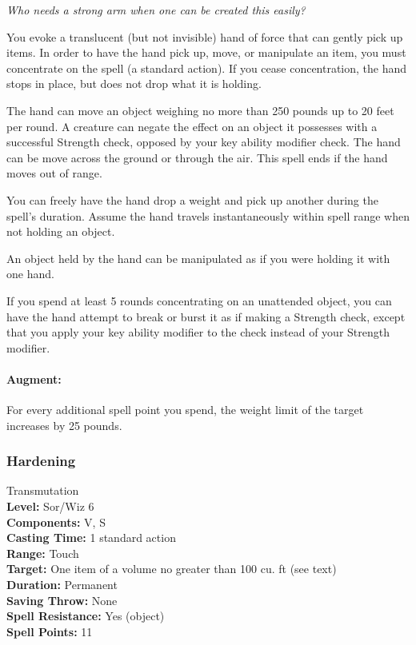 \emph{Who needs a strong arm when one can be created this easily?}

You evoke a translucent (but not invisible) hand of force that can gently pick up items.
In order to have the hand pick up, move, or manipulate an item, you must concentrate on the spell (a standard action).
If you cease concentration, the hand stops in place, but does not drop what it is holding.

The hand can move an object weighing no more than 250 pounds up to 20 feet per round. 
A creature can negate the effect on an object it possesses with a successful Strength check, opposed by your key ability modifier check. 
The hand can be move across the ground or through the air. 
This spell ends if the hand moves out of range. 

You can freely have the hand drop a weight and pick up another during the spell's duration.
Assume the hand travels instantaneously within spell range when not holding an object.

An object held by the hand can be manipulated as if you were holding it with one hand.

If you spend at least 5 rounds concentrating on an unattended object, 
you can have the hand attempt to break or burst it as if making a Strength check, 
except that you apply your key ability modifier to the check instead of your Strength modifier.

\paragraph{Augment:}
For every additional spell point you spend, the weight limit of the target increases by 25 pounds.
\subsubsection{Hardening}
\label{Spell:Hardening}
Transmutation
\\ \textbf{Level:} Sor/Wiz 6
\\ \textbf{Components:} V, S
\\ \textbf{Casting Time:} 1 standard action
\\ \textbf{Range:} Touch
\\ \textbf{Target:} One item of a volume no greater than 100 cu. ft (see text)
\\ \textbf{Duration:} Permanent
\\ \textbf{Saving Throw:} None
\\ \textbf{Spell Resistance:} Yes (object)
\\ \textbf{Spell Points:} 11

